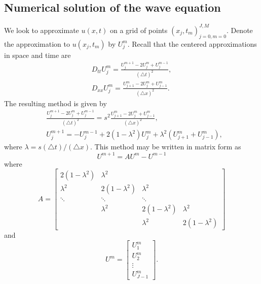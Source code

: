 \subsection*{Numerical solution of the wave equation}
We look to approximate $u(x,t)$ on a grid of points $(x_j,t_m)_{j=0,m=0}^{J,M}$.
Denote the approximation to $u(x_j,t_m)$ by $U_{j}^{m}$.
Recall that the centered approximations in space and time are
\begin{align*}
D_{tt} U_{j}^{m} = \frac{U_{j}^{m+1} -2 U_{j}^{m} + U_{j}^{m-1}}{(\triangle t)^2} ,\\
D_{xx} U_{j}^{m} = \frac{U_{j+1}^{m} -2 U_{j}^{m} + U_{j-1}^{m}}{(\triangle x)^2} .
\end{align*}
% 
The resulting method is given by 
\begin{align*}
	&\frac{U_{j}^{m+1} -2 U_{j}^{m} + U_{j}^{m-1}}{(\triangle t)^2} = s^2 \frac{U_{j+1}^{m} -2 U_{j}^{m} + U_{j-1}^{m}}{(\triangle x)^2}, \\
	&U_{j}^{m+1} =  - U_{j}^{m-1} + 2 (1-\lambda^2) U_{j}^{m} + \lambda ^2 (U_{j+1}^{m} + U_{j-1}^{m}),
\end{align*}
where $ \lambda  =  s(\triangle t)/(\triangle x)$. This method may be written in matrix form as 
\[U^{m+1} = AU^{m} - U^{m-1} \]
where 
\[
A = 
\left[\begin{array}{cccc}2(1-\lambda^2) & \lambda^2 &  &  \\ \lambda^2 & 2(1-\lambda^2) & \lambda^2 &  \\ \ddots & \ddots & \ddots &  \\ & \lambda^2 & 2(1-\lambda^2) & \lambda^2 \\  &  & \lambda^2 & 2(1-\lambda^2)\end{array}\right]
\]
and
\[ U^m = 
\left[\begin{array}{c}U_{1}^{m} \\U_{2}^{m} \\\vdots \\U_{J-1}^{m}\end{array}\right].
\]


